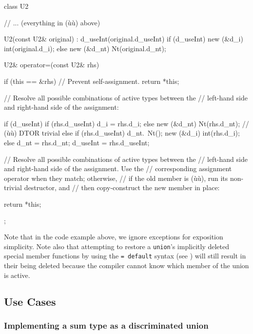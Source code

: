 \begin{emcppslisting}[emcppsbatch=e4]
class U2
{
    // ... (everything in (ù{}ù) above)

    U2(const U2& original) : d_useInt(original.d_useInt)
    {
        if (d_useInt) { new (&d_i) int(original.d_i);  }
        else          { new (&d_nt) Nt(original.d_nt); }
    }

    U2& operator=(const U2& rhs)
    {
        if (this == &rhs) // Prevent self-assignment.
        {
            return *this;
        }

        // Resolve all possible combinations of active types between the
        // left-hand side and right-hand side of the assignment:

        if (d_useInt)
        {
            if (rhs.d_useInt) { d_i = rhs.d_i; }
            else              { new (&d_nt) Nt(rhs.d_nt); }  // (ù{}ù) DTOR trivial
        }
        else
        {
            if (rhs.d_useInt) { d_nt.~Nt(); new (&d_i) int(rhs.d_i); }
            else              { d_nt = rhs.d_nt; }
        } d_useInt = rhs.d_useInt;

        // Resolve all possible combinations of active types between the
        // left-hand side and right-hand side of the assignment.  Use the
        // corresponding assignment operator when they match; otherwise,
        // if the old member is (ù{}ù), run its non-trivial destructor, and
        // then copy-construct the new member in place:

        return *this;
    }
};
\end{emcppslisting}
Note that in the code example above, we ignore exceptions for exposition simplicity. Note also that attempting to
restore a \lstinline!union!'s implicitly deleted special member
functions by using the \lstinline!=!~\lstinline!default! syntax (see
) will still result in their being deleted because
the compiler cannot know which member of the union is active.

\subsection[Use Cases]{Use Cases}\label{unrestrictedunion-use-cases}

\subsubsection[Implementing a \romeogloss{sum type} as a discriminated {\tt union}]{Implementing a sum type as a discriminated {\SubsubsecCode union}}\label{implementing-a-sum-type-as-a-discriminating-(or-tagged)-union}


